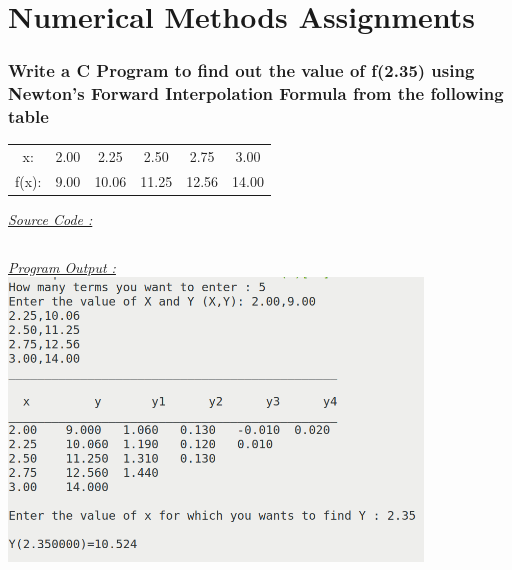 \documentclass{report}
\begin{document}

\newpage
\large{\tableofcontents}
\clearpage
{}

\chapter{Numerical Methods Assignments}

\subsection{Write a C Program to find out the value of f(2.35) using Newton's Forward Interpolation Formula from the following table}
\begin{center}
\begin{tabular}{c|c|c|c|c|c}
  x: & 2.00 & 2.25 & 2.50 & 2.75 & 3.00 \\
  f(x): & 9.00 & 10.06 & 11.25 & 12.56 & 14.00 
\end{tabular}
\end{center}
\bigbreak
\underline{\emph{\Large Source Code :}}
\inputminted[breaklines]{c}{../codes/Q01.c}
\bigbreak
\noindent
\underline{\emph{\Large Program Output :}}
\bigbreak
\noindent
\includegraphics[width=110mm,scale=0.5]{../outputs/light/Q01.png}
\end{document}
